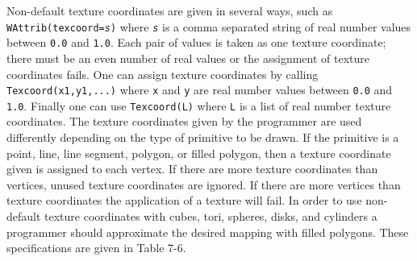 Non-default texture coordinates are given in several ways, such as \linebreak
\texttt{WAttrib({\textquotedbl}texcoord=}\texttt{\textit{s{\textquotedbl}}}\texttt{)}
where \texttt{\textit{s}} is a comma separated string of real number
values between \texttt{0.0} and \texttt{1.0}. Each pair of values is
taken as one texture coordinate; there must be an even number of real
values or the assignment of texture coordinates fails. One
can assign texture coordinates by calling \texttt{Texcoord(x1,y1,...)}
where \texttt{x} and \texttt{y} are real number values between
\texttt{0.0} and \texttt{1.0}. Finally one can use \texttt{Texcoord(L)}
where \texttt{L} is a list of real number texture coordinates. The
texture coordinates given by the programmer are used differently
depending on the type of primitive to be drawn. If the primitive is a
point, line, line segment, polygon, or filled polygon, then a texture
coordinate given is assigned to each vertex. If there are more texture
coordinates than vertices, unused texture coordinates are ignored. If
there are more vertices than texture coordinates the application of a
texture will fail. In order to use non-default texture coordinates
with cubes, tori, spheres, disks, and cylinders a programmer should
approximate the desired mapping with filled polygons. These
specifications are given in Table 7-6.


